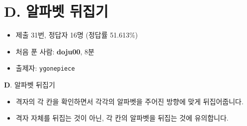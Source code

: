 \section{D. 알파벳 뒤집기}

\begin{frame} %
    \begin{itemize}
        \item 제출 31번, 정답자 16명 (정답률 51.613\%)
        \item 처음 푼 사람: \textbf{doju00}, 8분
        \item 출제자: \texttt{ygonepiece}
    \end{itemize}
\end{frame}

\begin{frame}{\textbf{D}. 알파벳 뒤집기}
    \begin{itemize}
        \item 격자의 각 칸을 확인하면서 각각의 알파벳을 주어진 방향에 맞게 뒤집어줍니다.
        \item 격자 자체를 뒤집는 것이 아닌, 각 칸의 알파벳을 뒤집는 것에 유의합니다.
    \end{itemize}
\end{frame}